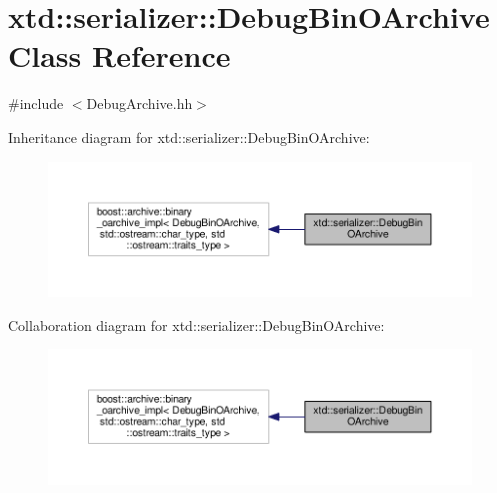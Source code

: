 \hypertarget{classxtd_1_1serializer_1_1DebugBinOArchive}{}\section{xtd\+:\+:serializer\+:\+:Debug\+Bin\+O\+Archive Class Reference}
\label{classxtd_1_1serializer_1_1DebugBinOArchive}


{\ttfamily \#include $<$Debug\+Archive.\+hh$>$}



Inheritance diagram for xtd\+:\+:serializer\+:\+:Debug\+Bin\+O\+Archive\+:
\nopagebreak
\begin{figure}[H]
\begin{center}
\leavevmode
\includegraphics[width=350pt]{classxtd_1_1serializer_1_1DebugBinOArchive__inherit__graph}
\end{center}
\end{figure}


Collaboration diagram for xtd\+:\+:serializer\+:\+:Debug\+Bin\+O\+Archive\+:
\nopagebreak
\begin{figure}[H]
\begin{center}
\leavevmode
\includegraphics[width=350pt]{classxtd_1_1serializer_1_1DebugBinOArchive__coll__graph}
\end{center}
\end{figure}
